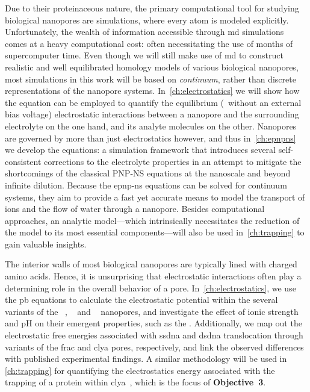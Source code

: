 Due to their proteinaceous nature, the primary computational tool for studying biological nanopores are
 simulations, where every atom is modeled explicitly. Unfortunately, the wealth of information
accessible through \gls{md} simulations comes at a heavy computational cost: often necessitating the use of
months of supercomputer time. Even though we will still make use of \gls{md} to construct realistic and well
equilibrated homology models of various biological nanopores, most simulations in this work will be based on
\emph{continuum}, rather than discrete representations of the nanopore systems. In~\cref{ch:electrostatics} we
will show how the  equation can be employed to quantify the equilibrium (\ie~without an external
bias voltage) electrostatic interactions between a nanopore and the surrounding electrolyte on the one hand,
and its analyte molecules on the other. Nanopores are governed by more than just electrostatics however, and
thus in~\cref{ch:epnpns} we develop the  equations: a simulation framework that introduces
several self-consistent corrections to the electrolyte properties in an attempt to mitigate the shortcomings
of the classical {PNP-NS} equations at the nanoscale and beyond infinite dilution. Because the \gls{epnp-ns}
equations can be solved for continuum systems, they aim to provide a fast yet accurate means to model the
transport of ions and the flow of water through a nanopore. Besides computational approaches, an analytic
model---which intrinsically necessitates the reduction of the model to its most essential components---will
also be used in~\cref{ch:trapping} to gain valuable insights.

%
%

The interior walls of most biological nanopores are typically lined with charged amino acids. Hence, it is
unsurprising that electrostatic interactions often play a determining role in the overall behavior of a pore.
In~\cref{ch:electrostatics}, we use the \gls{pb} equations to calculate the electrostatic potential within the
several variants of the ~\cite{Huang-2020}, ~\cite{Wloka-2016,Huang-2017} and
~\cite{Franceschini-2016} nanopores, and investigate the effect of ionic strength and pH on
their emergent properties, such as the . Additionally, we map out the electrostatic free
energies associated with \gls{ssdna} and \gls{dsdna} translocation through variants of the \gls{frac} and
\gls{clya} pores, respectively, and link the observed differences with published experimental findings. A
similar methodology will be used in \cref{ch:trapping} for quantifying the electrostatics energy associated
with the trapping of a protein within \gls{clya}~\cite{Soskine-Biesemans-2015}, which is the focus of
\textbf{Objective~3}.

